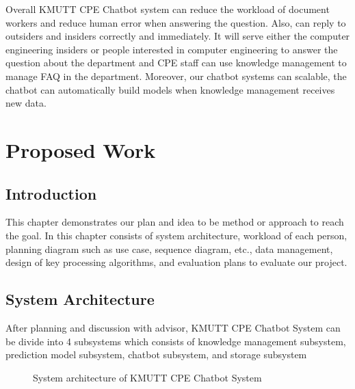 \documentclass[12pt,oneside,openright,a4paper]{cpe-english-project}
\begin{document}
Overall KMUTT CPE Chatbot system can reduce the workload of document workers and reduce human
error when answering the question. Also, can reply to outsiders and insiders correctly and
immediately. It will serve either the computer engineering insiders or people interested in
computer engineering to answer the question about the department and CPE staff can use
knowledge management to manage FAQ in the department.
Moreover, our chatbot systems can scalable, the chatbot can automatically build models
when knowledge management receives new data.

\chapter{Proposed Work}

\section{Introduction}
This chapter demonstrates our plan and idea to be method or approach to reach the goal. In this chapter consists of system architecture, workload of each person, planning diagram such as use case, sequence diagram, etc., data management, design of key processing algorithms, and evaluation plans to evaluate our project.

\section{System Architecture}
After planning and discussion with advisor, KMUTT CPE Chatbot System can be divide into 4 subsystems which consists of knowledge management subsystem, prediction model subsystem, chatbot subsystem, and storage subsystem
\begin{figure}[h!]
	\centering
	\setlength{\fboxrule}{0.2mm}
	\setlength{\fboxsep}{0.5cm}
	\caption{System architecture of KMUTT CPE Chatbot System}
	\label{fig:System architecture of KMUTT CPE Chatbot System}
\end{figure}
\end{document}
